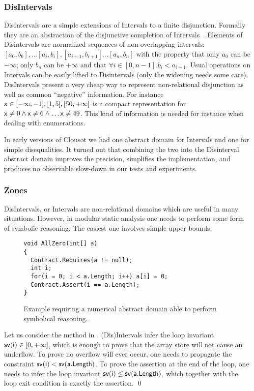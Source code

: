 \documentclass{llncs}
\begin{document}
\subsubsection{DisIntervals}
DisIntervals are a simple extensions of Intervals to a finite disjunction.
Formally they are an abstraction of the disjunctive completion of Intervals~\cite{CousotCousot79-1-POPL}.
Elements of Disintervals are normalized sequences of non-overlapping intervals: $[a_0, b_0], \dots [a_i, b_i], [a_{i+1}, b_{i+1}] \dots [a_n, b_n]$ with the property that only $a_0$ can be $-\infty$; only $b_n$ can be $+\infty$ and that $\forall i \in [0, n-1]. b_{i} < a_{i+1}$.
Usual operations on Intervals can be easily lifted to Disintervals (only the widening needs some care).
DisIntervals present a very cheap way to represent non-relational disjunction as well as common ``negative'' information.
For instance $\mathsf{x} \in [-\infty, -1], [1, 5], [50,  +\infty]$  is a compact representation for $\mathsf{x} \neq 0 \wedge \mathsf{x} \neq 6 \wedge \dots \mathsf{x} \neq 49$.
This kind of information is needed for instance when dealing with enumerations.

In early versions of Clousot we had one abstract domain for Intervals
and one for simple disequalities.  It turned out that combining the
two into the Disinterval abstract domain improves the precision,
simplifies the implementation, and produces no observable slow-down in
our tests and experiments.

\subsubsection{Zones}
DisIntervals, or Intervals are non-relational domains which are useful
in many situations.  However, in modular static analysis one needs to
perform some form of symbolic reasoning.  The easiest one 
involves simple upper bounds.

\begin{wrapfigure}{l}{0pt}
\begin{lstlisting}
void AllZero(int[] a)
{
  Contract.Requires(a != null);
  int i;
  for(i = 0; i < a.Length; i++) a[i] = 0;
  Contract.Assert(i == a.Length);
}
\end{lstlisting}
\caption{Example requiring a numerical abstract domain able to perform symbolical reasoning.}
\label{fig:allzero}
\end{wrapfigure}

\begin{example}
Let us consider the method  in .
(Dis)Intervals infer the loop invariant $\mathsf{sv(i)} \in [0, +\infty]$, which is enough to prove that the array store will not cause an underflow.
To prove no overflow will ever occur, one needs to propagate the constraint $\mathsf{sv(i)} < \mathsf{sv(a.Length)}$.
To prove the assertion at the end of the loop, one needs to infer the loop invariant $\mathsf{sv(i)} \leq \mathsf{sv(a.Length)}$, which together with the loop exit condition is exactly the  assertion. \qed
\end{example}
\end{document}
